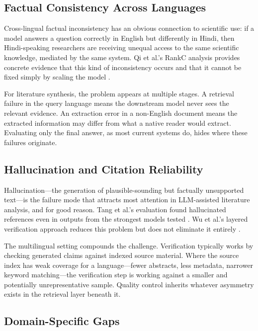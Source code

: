 \documentclass[acmsmall,screen,review]{acmart}
\begin{document}
\subsection{Factual Consistency Across Languages}
\label{sec:factual-consistency}

Cross-lingual factual inconsistency has an obvious connection to
scientific use: if a model answers a question correctly in English but
differently in Hindi, then Hindi-speaking researchers are receiving
unequal access to the same scientific knowledge, mediated by the same
system.  Qi et al.'s RankC analysis provides concrete evidence that this
kind of inconsistency occurs and that it cannot be fixed simply by scaling
the model \citep{qi2023crosslingual}.

For literature synthesis, the problem appears at multiple stages.  A
retrieval failure in the query language means the downstream model never
sees the relevant evidence.  An extraction error in a non-English
document means the extracted information may differ from what a native
reader would extract.  Evaluating only the final answer, as most current
systems do, hides where these failures originate.

\subsection{Hallucination and Citation Reliability}
\label{sec:hallucination}

Hallucination---the generation of plausible-sounding but factually
unsupported text---is the failure mode that attracts most attention in
LLM-assisted literature analysis, and for good reason.  Tang et al.'s
evaluation found hallucinated references even in outputs from the
strongest models tested \citep{tang2025automated}.  Wu et al.'s layered
verification approach reduces this problem but does not eliminate it
entirely \citep{wu2025automated}.

The multilingual setting compounds the challenge.  Verification typically
works by checking generated claims against indexed source material.  Where
the source index has weak coverage for a language---fewer abstracts, less
metadata, narrower keyword matching---the verification step is working
against a smaller and potentially unrepresentative sample.  Quality
control inherits whatever asymmetry exists in the retrieval layer beneath
it.

\subsection{Domain-Specific Gaps}
\label{sec:domain-gaps}
\end{document}
